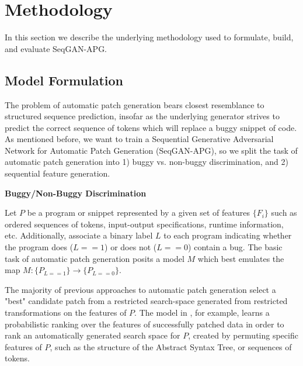 \documentclass[sigconf]{acmart}
\begin{document}
\section{Methodology}
\label{sec:methods}
In this section we describe the underlying methodology used to formulate, build, and evaluate SeqGAN-APG. %

\subsection{Model Formulation}
\label{sec:model}
The problem of automatic patch generation bears closest resemblance to structured sequence prediction, insofar as the underlying generator strives to predict the correct sequence of tokens which will replace a buggy snippet of code. As mentioned before, we want to train a Sequential Generative Adversarial Network for Automatic Patch Generation (SeqGAN-APG), so we split the task of automatic patch generation into 1) buggy vs. non-buggy discrimination, and 2) sequential feature generation. 

\textbf{Buggy/Non-Buggy Discrimination}

Let $P$ be a program or snippet represented by a given set of features $\{F_i\}$ such as ordered sequences of tokens, input-output specifications, runtime information, etc. Additionally, associate a binary label $L$ to each program indicating whether the program does ($L == 1$) or does not ($L == 0$) contain a bug. The basic task of automatic patch generation posits a model $M$ which best emulates the map	$M: \{P_{L == 1}\} \rightarrow \{P_{L == 0}\}$.

The majority of previous approaches to automatic patch generation select a "best" candidate patch from a restricted search-space generated from restricted transformations on the features of $P$. The model in \cite{long2016automatic}, for example, learns a probabilistic ranking over the features of successfully patched data in order to rank an automatically generated search space for $P$, created by permuting specific features of $P$, such as the structure of the Abstract Syntax Tree, or sequences of tokens.
\end{document}

